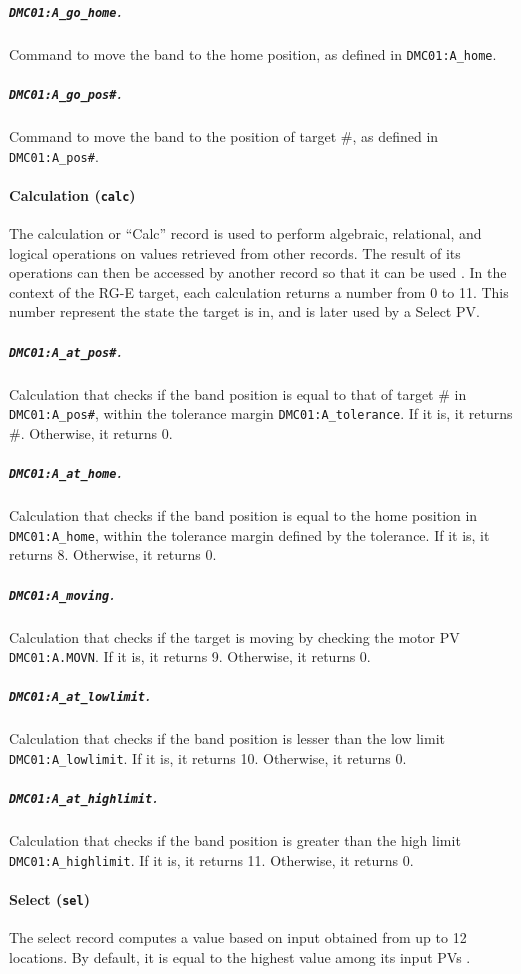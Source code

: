         \subparagraph{\texttt{DMC01:A\_go\_home}.}
            Command to move the band to the home position, as defined in \texttt{DMC01:A\_home}.

        \subparagraph{\texttt{DMC01:A\_go\_pos\#}.}
            Command to move the band to the position of target \#, as defined in \texttt{DMC01:A\_pos\#}.

    \paragraph{Calculation (\texttt{calc})}
        The calculation or ``Calc'' record is used to perform algebraic, relational, and logical operations on values retrieved from other records.
        The result of its operations can then be accessed by another record so that it can be used \cite{stanley1998}.
        In the context of the RG-E target, each calculation returns a number from 0 to 11.
        This number represent the state the target is in, and is later used by a Select PV.

        \subparagraph{\texttt{DMC01:A\_at\_pos\#}.}
            Calculation that checks if the band position is equal to that of target \# in \texttt{DMC01:A\_pos\#}, within the tolerance margin \texttt{DMC01:A\_tolerance}.
            If it is, it returns \#.
            Otherwise, it returns 0.

        \subparagraph{\texttt{DMC01:A\_at\_home}.}
            Calculation that checks if the band position is equal to the home position in \texttt{DMC01:A\_home}, within the tolerance margin defined by the tolerance.
            If it is, it returns 8.
            Otherwise, it returns 0.

        \subparagraph{\texttt{DMC01:A\_moving}.}
            Calculation that checks if the target is moving by checking the motor PV \texttt{DMC01:A.MOVN}.
            If it is, it returns 9.
            Otherwise, it returns 0.

        \subparagraph{\texttt{DMC01:A\_at\_lowlimit}.}
            Calculation that checks if the band position is lesser than the low limit \texttt{DMC01:A\_lowlimit}.
            If it is, it returns 10.
            Otherwise, it returns 0.

        \subparagraph{\texttt{DMC01:A\_at\_highlimit}.}
            Calculation that checks if the band position is greater than the high limit \texttt{DMC01:A\_highlimit}.
            If it is, it returns 11.
            Otherwise, it returns 0.

    \paragraph{Select (\texttt{sel})}
        The select record computes a value based on input obtained from up to 12 locations.
        By default, it is equal to the highest value among its input PVs \cite{stanley1998}.

